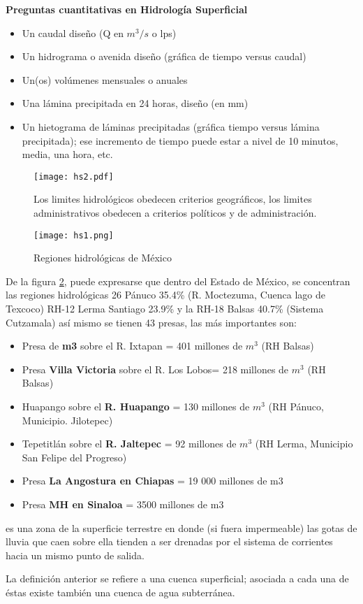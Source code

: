 \textbf{Preguntas cuantitativas en Hidrología Superficial}
\begin{itemize}
    \item Un caudal diseño (Q en $m^3/s$ o lps)
    \item Un hidrograma o avenida diseño (gráfica de tiempo versus caudal)
    \item Un(os) volúmenes mensuales o anuales
    \item Una lámina precipitada en 24 horas, diseño (en mm)
    \item Un hietograma de láminas precipitadas (gráfica tiempo versus lámina precipitada); ese incremento de tiempo puede estar a nivel de 10 minutos, media, una hora, etc.
\end{itemize}
\begin{figure}[h!]
\centering
  \texttt{[image: hs2.pdf]}
  \caption{Los limites hidrológicos obedecen criterios geográficos, los limites administrativos obedecen a criterios políticos y de administración.  }
  \label{hs2}
\end{figure}
\begin{figure}[h!]
    \centering
      \texttt{[image: hs1.png]}
      \caption{Regiones hidrológicas de México}
      \label{hs1}
\end{figure}
De la figura \ref{hs1}, puede expresarse que dentro del Estado de México, se concentran las regiones hidrológicas 26 Pánuco 35.4\% (R. Moctezuma, Cuenca lago de Texcoco)
RH-12 Lerma Santiago 23.9\% y la RH-18 Balsas 40.7\% (Sistema Cutzamala) así mismo se tienen 43 presas, las más importantes son:
\begin{itemize}
    \item Presa de \textbf{m3} sobre el R. Ixtapan = 401 millones de $m^3$ (RH Balsas)
    \item Presa \textbf{Villa Victoria} sobre el R. Los Lobos= 218 millones de $m^3$ (RH Balsas)
    \item Huapango sobre el \textbf{R. Huapango} = 130 millones de $m^3$ (RH Pánuco, Municipio. Jilotepec)
    \item Tepetitlán sobre el \textbf{R. Jaltepec} = 92 millones de $m^3$ (RH Lerma, Municipio San Felipe del Progreso)
    \item Presa \textbf{La Angostura en Chiapas} = 19 000 millones de m3
    \item Presa \textbf{MH en Sinaloa} = 3500 millones de m3
\end{itemize}

\begin{definition}[Cuenca]
    es una zona de la superficie terrestre en donde (si fuera impermeable) las gotas de lluvia que caen sobre ella tienden a ser drenadas por el sistema de corrientes hacia un mismo punto de salida.
\end{definition}
La definición anterior se refiere a una cuenca superficial; asociada a cada una de éstas existe también una cuenca de agua subterránea.


